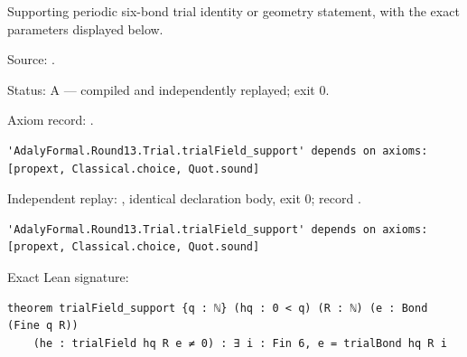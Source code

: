 \begin{theorem}[bp-359]
\label{bp-359}
\leanok
Supporting periodic six-bond trial identity or geometry statement, with the exact parameters displayed below.

\par Source: \texttt{}.
\par Status: A — compiled and independently replayed; exit 0.
\par Axiom record: \texttt{}.
\begin{verbatim}
'AdalyFormal.Round13.Trial.trialField_support' depends on axioms: [propext, Classical.choice, Quot.sound]
\end{verbatim}
\par Independent replay: \texttt{}, identical declaration body, exit 0; record \texttt{}.
\begin{verbatim}
'AdalyFormal.Round13.Trial.trialField_support' depends on axioms: [propext, Classical.choice, Quot.sound]
\end{verbatim}
\par Exact Lean signature:
\begin{verbatim}
theorem trialField_support {q : ℕ} (hq : 0 < q) (R : ℕ) (e : Bond (Fine q R))
    (he : trialField hq R e ≠ 0) : ∃ i : Fin 6, e = trialBond hq R i
\end{verbatim}
\end{theorem}

